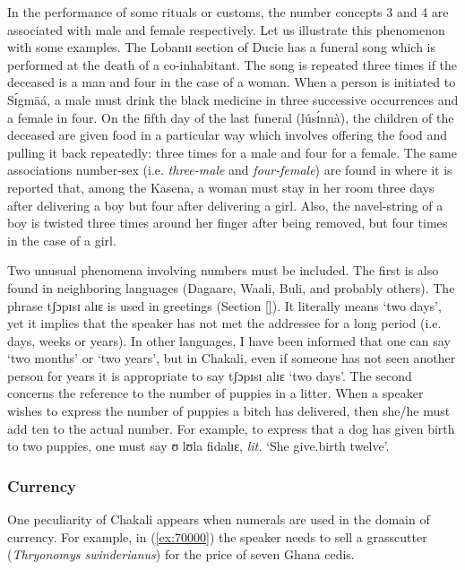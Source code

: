 \begin{exe}
\begin{exe}
\begin{exe}
{\begin{exe}
\begin{exe}
\begin{exe}
\begin{exe}
\begin{exe}
\begin{exe}
\begin{exe}
\begin{exe}
\begin{exe}
In the performance of some rituals or customs, the number concepts 3
and 4 are associated with male and female respectively. Let us illustrate this
phenomenon 
with some examples. The Lobanɪɪ section of Ducie has a funeral song which is 
performed at
the death of a co-inhabitant. The song is repeated three times if the deceased
is a man and four in the case of a woman. When a person is initiated
to {\sls Sɪ́gmāá}, a male must drink the black medicine in three successive
occurrences and a female in four.  On the fifth day of the last funeral 
({\sls lúsɪ́nnà}), the children of the deceased are given food in a 
particular 
way
which involves offering the food and pulling  it back repeatedly: three times
for a male and four for a female. The same associations number-sex (i.e. {\it
three-male} and {\it
four-female})
are found in \citet[68-70]{Card27} where it is reported that, among the Kasena,
a woman must stay in her room three days after delivering a boy but four after
delivering a girl. Also,  the navel-string of a boy is twisted three times
 around her finger after being removed, but four times in the case of a
girl.

Two unusual phenomena involving numbers must be included. The first is
also found in neighboring languages (Dagaare, Waali, Buli, and probably 
others). 
The phrase {\sls tʃɔpɪsɪ alɪɛ} is used in greetings (Section \ref{}).   It 
literally means `two
days', yet it implies that the speaker has not met the addressee for a long
period  (i.e. days, weeks or years). In other languages, I have been informed 
that one
can say `two months' or `two years', but in Chakali, even if someone has not
seen another person for years it is appropriate to say  {\sls tʃɔpɪsɪ alɪɛ} `two
days'. The second concerns the reference to the number of puppies in a litter.
When a
speaker wishes to express the number of puppies a bitch has delivered, then
she/he
must add ten to the actual number. For example,  to express that a dog has given
birth to two puppies, one must say {\sls ʊ lʊla fidalɪɛ},  {\it lit.}  `She
give.birth twelve'. 




\subsubsection{Currency}
\label{sec:NUM-currency}

One peculiarity of Chakali appears when numerals are used in the domain of
currency. For example,  in (\ref{ex:70000}) the speaker needs to sell a
grasscutter (\textit{Thryonomys swinderianus}) for the price of seven Ghana
cedis.



\end{exe}
\end{exe}
\end{exe}
\end{exe}
\end{exe}
\end{exe}
\end{exe}
\end{exe}
\end{exe}}
\end{exe}
\end{exe}
\end{exe}
